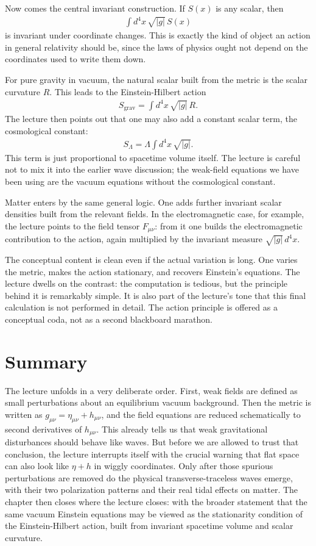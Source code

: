 Now comes the central invariant construction. If \(S(x)\) is any scalar, then
\begin{align}
\int d^{4}x\,\sqrt{|g|}\,S(x)
\end{align}
is invariant under coordinate changes. This is exactly the kind of object an action in general relativity should be, since the laws of physics ought not depend on the coordinates used to write them down.

For pure gravity in vacuum, the natural scalar built from the metric is the scalar curvature \(R\). This leads to the Einstein-Hilbert action
\begin{align}
S_{\mathrm{grav}}=\int d^{4}x\,\sqrt{|g|}\,R.
\end{align}
The lecture then points out that one may also add a constant scalar term, the cosmological constant:
\begin{align}
S_{\Lambda}=\Lambda\int d^{4}x\,\sqrt{|g|}.
\end{align}
This term is just proportional to spacetime volume itself. The lecture is careful not to mix it into the earlier wave discussion; the weak-field equations we have been using are the vacuum equations without the cosmological constant.

Matter enters by the same general logic. One adds further invariant scalar densities built from the relevant fields. In the electromagnetic case, for example, the lecture points to the field tensor \(F_{\mu\nu}\): from it one builds the electromagnetic contribution to the action, again multiplied by the invariant measure \(\sqrt{|g|}\,d^{4}x\).

The conceptual content is clean even if the actual variation is long. One varies the metric, makes the action stationary, and recovers Einstein's equations. The lecture dwells on the contrast: the computation is tedious, but the principle behind it is remarkably simple. It is also part of the lecture's tone that this final calculation is not performed in detail. The action principle is offered as a conceptual coda, not as a second blackboard marathon.

\section{Summary}

The lecture unfolds in a very deliberate order. First, weak fields are defined as small perturbations about an equilibrium vacuum background. Then the metric is written as \(g_{\mu\nu}=\eta_{\mu\nu}+h_{\mu\nu}\), and the field equations are reduced schematically to second derivatives of \(h_{\mu\nu}\). This already tells us that weak gravitational disturbances should behave like waves. But before we are allowed to trust that conclusion, the lecture interrupts itself with the crucial warning that flat space can also look like \(\eta+h\) in wiggly coordinates. Only after those spurious perturbations are removed do the physical transverse-traceless waves emerge, with their two polarization patterns and their real tidal effects on matter. The chapter then closes where the lecture closes: with the broader statement that the same vacuum Einstein equations may be viewed as the stationarity condition of the Einstein-Hilbert action, built from invariant spacetime volume and scalar curvature.